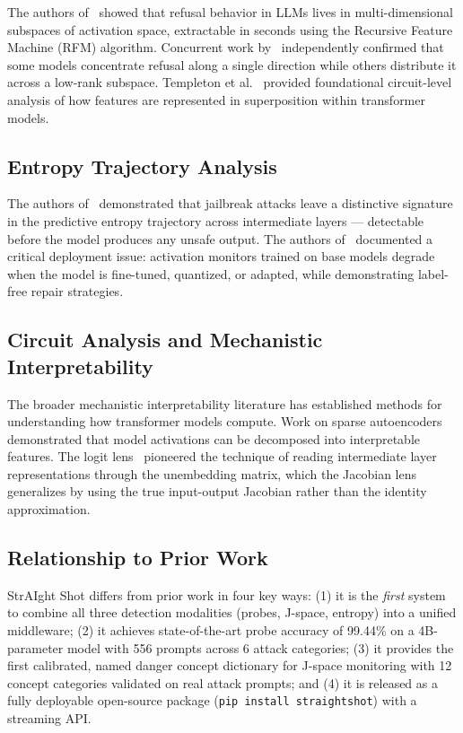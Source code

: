 \documentclass[11pt]{article}
\begin{document}
The authors of~\cite{rfm2026} showed that refusal behavior in LLMs lives in multi-dimensional subspaces of activation space, extractable in seconds using the Recursive Feature Machine (RFM) algorithm. Concurrent work by~\cite{refusalrep2026} independently confirmed that some models concentrate refusal along a single direction while others distribute it across a low-rank subspace. Templeton et al.~\cite{templeton2024} provided foundational circuit-level analysis of how features are represented in superposition within transformer models.

\subsection{Entropy Trajectory Analysis}

The authors of~\cite{entropy2026} demonstrated that jailbreak attacks leave a distinctive signature in the predictive entropy trajectory across intermediate layers — detectable before the model produces any unsafe output. The authors of~\cite{staleness2026} documented a critical deployment issue: activation monitors trained on base models degrade when the model is fine-tuned, quantized, or adapted, while demonstrating label-free repair strategies.

\subsection{Circuit Analysis and Mechanistic Interpretability}

The broader mechanistic interpretability literature has established methods for understanding how transformer models compute. Work on sparse autoencoders~\cite{sharkey2022,bricken2023} demonstrated that model activations can be decomposed into interpretable features. The logit lens~\cite{nostalgebraist2020} pioneered the technique of reading intermediate layer representations through the unembedding matrix, which the Jacobian lens generalizes by using the true input-output Jacobian rather than the identity approximation.

\subsection{Relationship to Prior Work}

StrAIght Shot differs from prior work in four key ways: (1) it is the \emph{first} system to combine all three detection modalities (probes, J-space, entropy) into a unified middleware; (2) it achieves state-of-the-art probe accuracy of 99.44\% on a 4B-parameter model with 556 prompts across 6 attack categories; (3) it provides the first calibrated, named danger concept dictionary for J-space monitoring with 12 concept categories validated on real attack prompts; and (4) it is released as a fully deployable open-source package (\texttt{pip install straightshot}) with a streaming API.
\end{document}
